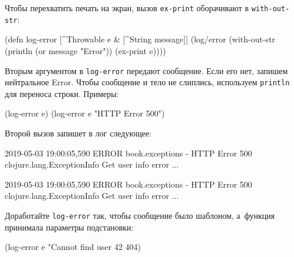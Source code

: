 Чтобы перехватить печать на экран, вызов \verb|ex-print| оборачивают в
\verb|with-out-str|:

\begin{english}
  \begin{clojure}
(defn log-error
  [^Throwable e & [^String message]]
  (log/error
   (with-out-str
     (println (or message "Error"))
     (ex-print e))))
  \end{clojure}
\end{english}

Вторым аргументом в \verb|log-error| передают сообщение. Если его нет, запишем
нейтральное Error. Чтобы сообщение и тело не слиплись, используем
\verb|println| для переноса строки. Примеры:

\begin{english}
  \begin{clojure}
(log-error e)
(log-error e "HTTP Error 500")
  \end{clojure}
\end{english}

Второй вызов запишет в лог следующее:

\ifx\devicetype\mobile

\begin{english}
  \begin{text}
2019-05-03 19:00:05,590 ERROR
book.exceptions - HTTP Error 500
clojure.lang.ExceptionInfo
  Get user info error
  ...
  \end{text}
\end{english}

\else

\begin{english}
  \begin{text}
2019-05-03 19:00:05,590 ERROR book.exceptions - HTTP Error 500
clojure.lang.ExceptionInfo
  Get user info error
  ...
  \end{text}
\end{english}

\fi

Доработайте \verb|log-error| так, чтобы сообщение было шаблоном, а~функция
принимала параметры подстановки:

\ifx\devicetype\mobile

\begin{english}
  \begin{clojure}
(log-error e
  "Cannot find user %
  42 404)
  \end{clojure}
\end{english}

